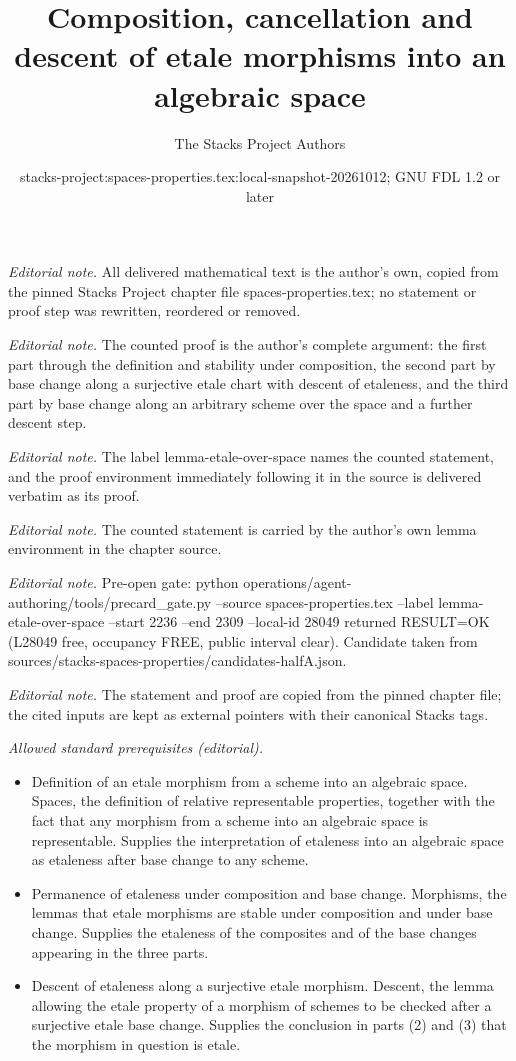 \documentclass[10pt,a4paper]{amsart}
\title{Composition, cancellation and descent of etale morphisms into an algebraic space}
\author{The Stacks Project Authors}
\date{stacks-project:spaces-properties.tex:local-snapshot-20261012; GNU FDL 1.2 or later}
\theoremstyle{plain}
\theoremstyle{definition}
\theoremstyle{remark}
\numberwithin{equation}{subsection}
\begin{document}
\maketitle
\noindent\textit{Editorial note.} All delivered mathematical text is the author's own, copied from the pinned Stacks Project chapter file spaces-properties.tex; no statement or proof step was rewritten, reordered or removed.\par\medskip
\noindent\textit{Editorial note.} The counted proof is the author's complete argument: the first part through the definition and stability under composition, the second part by base change along a surjective etale chart with descent of etaleness, and the third part by base change along an arbitrary scheme over the space and a further descent step.\par\medskip
\noindent\textit{Editorial note.} The label lemma-etale-over-space names the counted statement, and the proof environment immediately following it in the source is delivered verbatim as its proof.\par\medskip
\noindent\textit{Editorial note.} The counted statement is carried by the author's own lemma environment in the chapter source.\par\medskip
\noindent\textit{Editorial note.} Pre-open gate: python operations/agent-authoring/tools/precard\_gate.py --source spaces-properties.tex --label lemma-etale-over-space --start 2236 --end 2309 --local-id 28049 returned RESULT=OK (L28049 free, occupancy FREE, public interval clear). Candidate taken from sources/stacks-spaces-properties/candidates-halfA.json.\par\medskip
\noindent\textit{Editorial note.} The statement and proof are copied from the pinned chapter file; the cited inputs are kept as external pointers with their canonical Stacks tags.\par\medskip
\noindent\textit{Allowed standard prerequisites (editorial).}\begin{itemize}
\item Definition of an etale morphism from a scheme into an algebraic space. Spaces, the definition of relative representable properties, together with the fact that any morphism from a scheme into an algebraic space is representable. Supplies the interpretation of etaleness into an algebraic space as etaleness after base change to any scheme.
\item Permanence of etaleness under composition and base change. Morphisms, the lemmas that etale morphisms are stable under composition and under base change. Supplies the etaleness of the composites and of the base changes appearing in the three parts.
\item Descent of etaleness along a surjective etale morphism. Descent, the lemma allowing the etale property of a morphism of schemes to be checked after a surjective etale base change. Supplies the conclusion in parts (2) and (3) that the morphism in question is etale.
\end{itemize}\medskip
\end{document}
